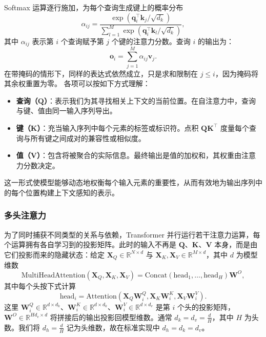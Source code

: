\documentclass[11pt]{article}
\newcommand{\R}{\mathbb{R}}
\newcommand{\mat}[1]{\mathbf{#1}}
\newcommand{\vecb}[1]{\mathbf{#1}}
\begin{document}
Softmax 运算逐行施加，为每个查询生成键上的概率分布
\begin{equation}
\label{eq:att-score}
\alpha_{ij} = \frac{\exp\left( \vecb{q}_i^\top \vecb{k}_j / \sqrt{d_k} \right)}{\sum_{l=1}^{M} \exp\left( \vecb{q}_i^\top \vecb{k}_l / \sqrt{d_k} \right)},
\end{equation}
其中 $\alpha_{ij}$ 表示第 $i$ 个查询赋予第 $j$ 个键的注意力分数。查询 $i$ 的输出为：
\begin{equation}
\vecb{o}_i = \sum_{j=1}^{M} \alpha_{ij} \vecb{v}_j.
\label{eq:context_vector}
\end{equation}
在带掩码的情形下，同样的表达式依然成立，只是求和限制在 $j \le i$，因为掩码将其余权重置为零。
各项可以按如下方式理解：
\begin{itemize}
    \item \textbf{查询（$\mat{Q}$）}：表示我们为其寻找相关上下文的当前位置。在自注意力中，查询与键、值由同一输入序列导出。
    \item \textbf{键（$\mat{K}$）}：充当输入序列中每个元素的标签或标识符。点积 $\mat{Q} \mat{K}^\top$ 度量每个查询与所有键之间成对的兼容性或相似度。
    \item \textbf{值（$\mat{V}$）}：包含将被聚合的实际信息。最终输出是值的加权和，其权重由注意力分数决定。
\end{itemize}
这一形式使模型能够动态地权衡每个输入元素的重要性，从而有效地为输出序列中的每个位置构建上下文感知的表示。


\subsubsection{多头注意力}

为了同时捕获不同类型的关系与依赖，Transformer 并行运行若干注意力运算，每个运算拥有各自学习到的投影矩阵。此时的输入不再是 $\mat{Q}$、$\mat{K}$、$\mat{V}$ 本身，而是由它们投影而来的隐藏状态：给定 $\mat{X}_Q \in \R^{N \times d}$ 与 $\mat{X}_K, \mat{X}_V \in \R^{M \times d}$，其中 $d$ 为模型维数
\begin{equation}
\text{MultiHeadAttention}(\mat{X}_Q, \mat{X}_K, \mat{X}_V) = \text{Concat}(\text{head}_1, \dots, \text{head}_H) \mat{W}^O,
\label{eq:multi_head}
\end{equation}
其中每个头按下式计算
\begin{equation}
\text{head}_i = \text{Attention}(\mat{X}_Q \mat{W}_i^Q, \mat{X}_K \mat{W}_i^K, \mat{X}_V \mat{W}_i^V).
\label{eq:head}
\end{equation}
这里 $\mat{W}_i^Q \in \R^{d \times d_k}$、$\mat{W}_i^K \in \R^{d \times d_k}$、$\mat{W}_i^V \in \R^{d \times d_v}$ 是第 $i$ 个头的投影矩阵，$\mat{W}^O \in \R^{H d_v \times d}$ 将拼接后的输出投影回模型维数。通常 $d_k = d_v = \frac{d}{H}$，其中 $H$ 为头数。我们将 $d_h = \frac{d}{H}$ 记为头维数，故在标准实现中 $d_h = d_k = d_v$。
\end{document}

